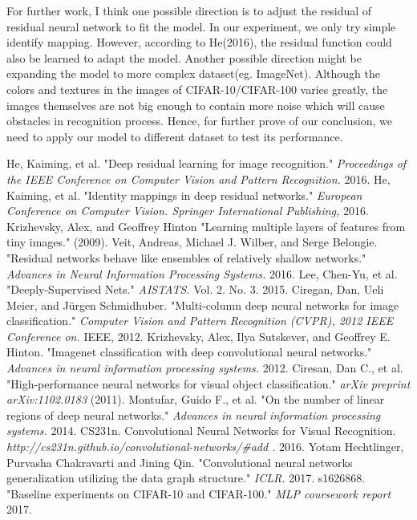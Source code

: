 \documentclass[]{article}
\begin{document}
For further work, I think one possible direction is to adjust the residual of residual neural network to fit the model. In our experiment, we only try simple identify mapping. However, according to He(2016), the residual function could also be learned to adapt the model. Another possible direction might be expanding the model to more complex dataset(eg. ImageNet). Although the colors and textures in the images of CIFAR-10/CIFAR-100 varies greatly, the images themselves are not big enough to contain more noise which will cause obstacles in recognition process. Hence, for further prove of our conclusion, we need to apply our model to different dataset to test its performance. 
\newpage
\begin{thebibliography}{9}
  He, Kaiming, et al.
  "Deep residual learning for image recognition."
  \emph{Proceedings of the IEEE Conference on Computer Vision and Pattern Recognition.}
  2016.
  He, Kaiming, et al.
  "Identity mappings in deep residual networks."
  \emph{European Conference on Computer Vision. Springer International Publishing,}
  2016.
  Krizhevsky, Alex, and Geoffrey Hinton
  "Learning multiple layers of features from tiny images."
  (2009).  
  Veit, Andreas, Michael J. Wilber, and Serge Belongie.
  "Residual networks behave like ensembles of relatively shallow networks."
  \emph{Advances in Neural Information Processing Systems.}
  2016.
  Lee, Chen-Yu, et al.
  "Deeply-Supervised Nets."
  \emph{AISTATS.}
  Vol. 2. No. 3. 2015.
  Ciregan, Dan, Ueli Meier, and Jürgen Schmidhuber.
  "Multi-column deep neural networks for image classification."
  \emph{Computer Vision and Pattern Recognition (CVPR), 2012 IEEE Conference on.}
  IEEE, 2012.
  Krizhevsky, Alex, Ilya Sutskever, and Geoffrey E. Hinton.
  "Imagenet classification with deep convolutional neural networks."
  \emph{Advances in neural information processing systems.}
  2012.
  Ciresan, Dan C., et al.
  "High-performance neural networks for visual object classification."
  \emph{arXiv preprint arXiv:1102.0183}
  (2011).
  Montufar, Guido F., et al.
  "On the number of linear regions of deep neural networks."
  \emph{Advances in neural information processing systems.}
  2014.  
  CS231n.
  Convolutional Neural Networks for Visual Recognition.
  \emph{http://cs231n.github.io/convolutional-networks/\#add .}
  2016.   
  Yotam Hechtlinger, Purvasha Chakravarti and Jining Qin.
  "Convolutional neural networks generalization utilizing the data graph structure."
  \emph{ICLR.}
  2017.
  s1626868.
  "Baseline experiments on CIFAR-10 and CIFAR-100."
  \emph{MLP coursework report}
  2017.

\end{thebibliography}
\end{document}
